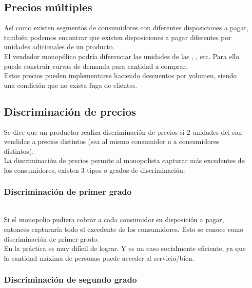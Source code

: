 \subsection{Precios múltiples}

Así como existen segmentos de consumidores con diferentes disposiciones a pagar, también podemos encontrar que existen disposiciones a pagar diferentes por unidades adicionales de un producto.\\

El vendedor monopólico podría diferenciar las  unidades de las , , etc. Para ello puede construir curvas de demanda para cantidad a comprar.\\

Estos precios pueden implementarse haciendo descuentos por volumen, siendo una condición que no exista fuga de clientes. 

\subsection{Discriminación de precios}
Se dice que un productor realiza discriminación de precios si 2 unidades del  son vendidas a precios distintos (sea al mismo consumidor o a consumidores distintos).\\

La discriminación de precios permite al monopolista capturar más excedentes de los consumidores, existen 3 tipos o grados de discriminación.

\subsubsection{Discriminación de primer grado}
\\

Si el monopolio pudiera cobrar a cada consumidor su disposición a pagar, entonces capturaría todo el excedente de los consumidores. Esto se conoce como discriminación de primer grado.\\

En la práctica es muy difícil de lograr. Y es un caso socialmente eficiente, ya que la cantidad máxima de personas puede acceder al servicio/bien.

\subsubsection{Discriminación de segundo grado}
\\

